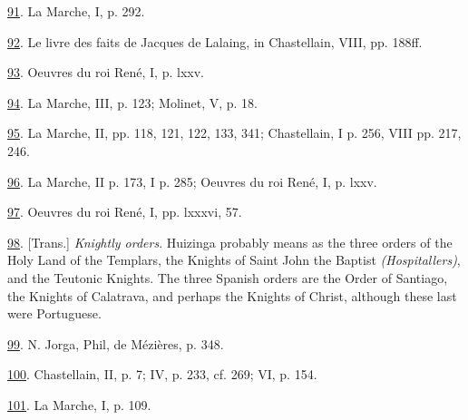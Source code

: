\protect\hypertarget{23_NOTES.xhtmlux5cux23id_1753}{\protect\hyperlink{10_Chapter_Three__THE_HEROIC_DREAM.xhtmlux5cux23id_1752}{91}}.
La Marche, I, p. 292.

\protect\hypertarget{23_NOTES.xhtmlux5cux23id_1751}{\protect\hyperlink{10_Chapter_Three__THE_HEROIC_DREAM.xhtmlux5cux23id_1750}{92}}.
Le livre des faits de Jacques de Lalaing, in Chastellain, VIII, pp.
188ff.

\protect\hypertarget{23_NOTES.xhtmlux5cux23page_408}{\protect\hyperlink{10_Chapter_Three__THE_HEROIC_DREAM.xhtmlux5cux23id_1749}{93}}.
Oeuvres du roi René, I, p. lxxv.

\protect\hypertarget{23_NOTES.xhtmlux5cux23id_1748}{\protect\hyperlink{10_Chapter_Three__THE_HEROIC_DREAM.xhtmlux5cux23id_1747}{94}}.
La Marche, III, p. 123; Molinet, V, p. 18.

\protect\hypertarget{23_NOTES.xhtmlux5cux23id_1746}{\protect\hyperlink{10_Chapter_Three__THE_HEROIC_DREAM.xhtmlux5cux23id_1745}{95}}.
La Marche, II, pp. 118, 121, 122, 133, 341; Chastellain, I p. 256, VIII
pp. 217, 246.

\protect\hypertarget{23_NOTES.xhtmlux5cux23id_1744}{\protect\hyperlink{10_Chapter_Three__THE_HEROIC_DREAM.xhtmlux5cux23id_1743}{96}}.
La Marche, II p. 173, I p. 285; Oeuvres du roi René, I, p. lxxv.

\protect\hypertarget{23_NOTES.xhtmlux5cux23id_1742}{\protect\hyperlink{10_Chapter_Three__THE_HEROIC_DREAM.xhtmlux5cux23id_1741}{97}}.
Oeuvres du roi René, I, pp. lxxxvi, 57.

\protect\hypertarget{23_NOTES.xhtmlux5cux23id_1740}{\protect\hyperlink{10_Chapter_Three__THE_HEROIC_DREAM.xhtmlux5cux23id_1739}{98}}.
{[}Trans.{]} \emph{Knightly orders}. Huizinga probably means as the
three orders of the Holy Land of the Templars, the Knights of Saint John
the Baptist \emph{(Hospitallers)}, and the Teutonic Knights. The three
Spanish orders are the Order of Santiago, the Knights of Calatrava, and
perhaps the Knights of Christ, although these last were Portuguese.

\protect\hypertarget{23_NOTES.xhtmlux5cux23id_1738}{\protect\hyperlink{10_Chapter_Three__THE_HEROIC_DREAM.xhtmlux5cux23id_1737}{99}}.
N. Jorga, Phil, de Mézières, p. 348.

\protect\hypertarget{23_NOTES.xhtmlux5cux23id_1736}{\protect\hyperlink{10_Chapter_Three__THE_HEROIC_DREAM.xhtmlux5cux23id_1735}{100}}.
Chastellain, II, p. 7; IV, p. 233, cf. 269; VI, p. 154.

\protect\hypertarget{23_NOTES.xhtmlux5cux23id_1734}{\protect\hyperlink{10_Chapter_Three__THE_HEROIC_DREAM.xhtmlux5cux23id_1733}{101}}.
La Marche, I, p. 109.

